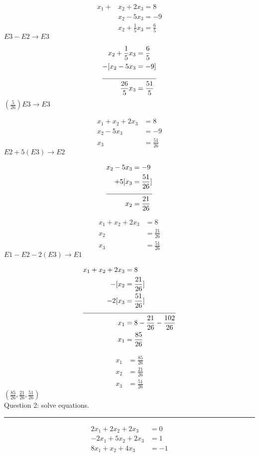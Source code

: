 \documentclass[a4paper,11pt,twoside]{report}
\begin{document}
\begin{align*}
	x_1 + &x_2 + 2x_3 =  8 \\
		  &x_2 - 5x_3 = -9 \\
		  &x_2 + \frac{1}{5}x_3 = \frac{6}{5}
\end{align*}
$E 3 - E 2 \to E 3$

\begin{align*}
		  x_2 + \frac{1}{5}x_3 &= \frac{6}{5} \\
		  -[x_2 - 5x_3 &= -9 ] \\
	\cline{1-2}
		  \frac{26}{5}x_3 &= \frac{51}{5}
\end{align*}
$(\frac{5}{26})E 3 \to E 3$

\begin{align*}
	x_1 + x_2 + 2x_3 &=  8 \\
	x_2 - 5x_3 &= -9 \\
		  x_3 &= \frac{51}{26}
\end{align*}
$E 2 + 5 (E 3) \to E 2$

\begin{align*}
	x_2 - 5x_3 &= -9 \\
		  +5[x_3 &= \frac{51}{26}] \\
	\cline{1-2}
		  x_2 &= \frac{21}{26}
\end{align*}

\begin{align*}
	x_1 + x_2 + 2x_3 &=  8 \\
		  x_2 &= \frac{21}{26}\\
		  x_3 &= \frac{51}{26}
\end{align*}
$E 1 - E 2 - 2(E 3) \to E 1$


\begin{align*}
	x_1 + x_2 + 2x_3 &=  8 \\
		  -[x_2 &= \frac{21}{26}] \\
		  -2[x_3 &= \frac{51}{26}] \\
	\cline{1-2}
		  x_1 &= 8 - \frac{21}{26} - \frac{102}{26} \\
		  x_1 &= \frac{85}{26}
	  \end{align*}


\begin{align*}
		  x_1 &= \frac{85}{26}\\
		  x_2 &= \frac{21}{26}\\
		  x_3 &= \frac{51}{26}
\end{align*}
$\boxed{\left(  \frac{85}{26},\frac{21}{26},\frac{51}{26}\right) }$ \\

\break \break \noindent Question 2: solve equations. \\ \hrule
\begin{align*}
	2x_1+2x_2+2x_3 &= 0 \\
	-2x_1+5x_2+2x_3 &= 1 \\
	8x_1+x_2+4x_3 &= -1 \\
\end{align*}



\newpage
\end{document}
